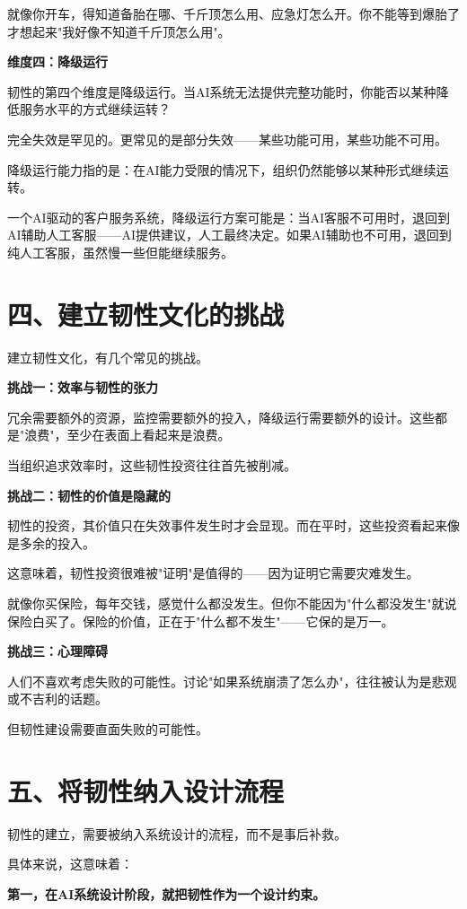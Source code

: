 就像你开车，得知道备胎在哪、千斤顶怎么用、应急灯怎么开。你不能等到爆胎了才想起来"我好像不知道千斤顶怎么用"。

\textbf{维度四：降级运行}

韧性的第四个维度是降级运行。当AI系统无法提供完整功能时，你能否以某种降低服务水平的方式继续运转？

完全失效是罕见的。更常见的是部分失效——某些功能可用，某些功能不可用。

降级运行能力指的是：在AI能力受限的情况下，组织仍然能够以某种形式继续运转。

一个AI驱动的客户服务系统，降级运行方案可能是：当AI客服不可用时，退回到AI辅助人工客服——AI提供建议，人工最终决定。如果AI辅助也不可用，退回到纯人工客服，虽然慢一些但能继续服务。

\section{四、建立韧性文化的挑战}


建立韧性文化，有几个常见的挑战。

\textbf{挑战一：效率与韧性的张力}

冗余需要额外的资源，监控需要额外的投入，降级运行需要额外的设计。这些都是"浪费"，至少在表面上看起来是浪费。

当组织追求效率时，这些韧性投资往往首先被削减。

\textbf{挑战二：韧性的价值是隐藏的}

韧性的投资，其价值只在失效事件发生时才会显现。而在平时，这些投资看起来像是多余的投入。

这意味着，韧性投资很难被"证明"是值得的——因为证明它需要灾难发生。

就像你买保险，每年交钱，感觉什么都没发生。但你不能因为"什么都没发生"就说保险白买了。保险的价值，正在于"什么都不发生"——它保的是万一。

\textbf{挑战三：心理障碍}

人们不喜欢考虑失败的可能性。讨论"如果系统崩溃了怎么办"，往往被认为是悲观或不吉利的话题。

但韧性建设需要直面失败的可能性。

\section{五、将韧性纳入设计流程}


韧性的建立，需要被纳入系统设计的流程，而不是事后补救。

具体来说，这意味着：

\textbf{第一，在AI系统设计阶段，就把韧性作为一个设计约束。}

